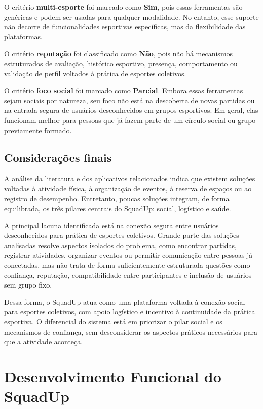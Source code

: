 \documentclass[a4paper, 12pt]{article}
\begin{document}
\begin{justify}
O critério \textbf{multi-esporte} foi marcado como \textbf{Sim}, pois essas ferramentas são genéricas e podem ser usadas para qualquer modalidade. No entanto, esse suporte não decorre de funcionalidades esportivas específicas, mas da flexibilidade das plataformas.

O critério \textbf{reputação} foi classificado como \textbf{Não}, pois não há mecanismos estruturados de avaliação, histórico esportivo, presença, comportamento ou validação de perfil voltados à prática de esportes coletivos.

O critério \textbf{foco social} foi marcado como \textbf{Parcial}. Embora essas ferramentas sejam sociais por natureza, seu foco não está na descoberta de novas partidas ou na entrada segura de usuários desconhecidos em grupos esportivos. Em geral, elas funcionam melhor para pessoas que já fazem parte de um círculo social ou grupo previamente formado.

\subsection{Considerações finais}

A análise da literatura e dos aplicativos relacionados indica que existem soluções voltadas à atividade física, à organização de eventos, à reserva de espaços ou ao registro de desempenho. Entretanto, poucas soluções integram, de forma equilibrada, os três pilares centrais do SquadUp: social, logístico e saúde.

A principal lacuna identificada está na conexão segura entre usuários desconhecidos para prática de esportes coletivos. Grande parte das soluções analisadas resolve aspectos isolados do problema, como encontrar partidas, registrar atividades, organizar eventos ou permitir comunicação entre pessoas já conectadas, mas não trata de forma suficientemente estruturada questões como confiança, reputação, compatibilidade entre participantes e inclusão de usuários sem grupo fixo.

Dessa forma, o SquadUp atua como uma plataforma voltada à conexão social para esportes coletivos, com apoio logístico e incentivo à continuidade da prática esportiva. O diferencial do sistema está em priorizar o pilar social e os mecanismos de confiança, sem desconsiderar os aspectos práticos necessários para que a atividade aconteça.

\clearpage

\section{Desenvolvimento Funcional do SquadUp}


\end{justify}
\end{document}
